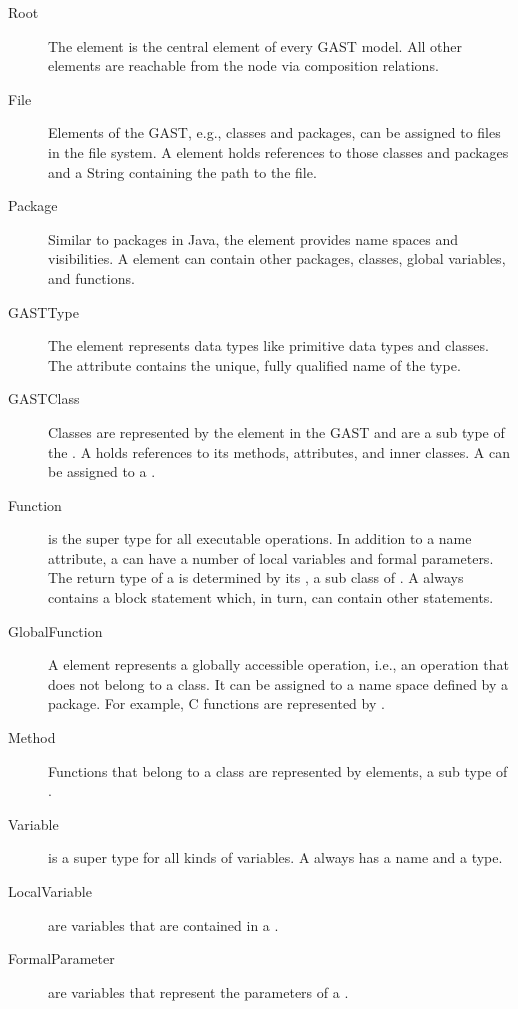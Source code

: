 \begin{description}
\item[Root] The  element is the central element of every GAST model. All other elements are reachable from the  node via composition relations.
\item[File] Elements of the GAST, e.g., classes and packages, can be assigned to files in the file system. A  element holds references to those classes and packages and a String containing the path to the file.
\item[Package] Similar to packages in Java, the  element provides name spaces and visibilities. A  element can contain other packages, classes, global variables, and functions.
\item[GASTType] The  element represents data types like primitive data types and classes. The attribute  contains the unique, fully qualified name of the type.
\item[GASTClass] Classes are represented by the element  in the GAST and are a sub type of the . A  holds references to its methods, attributes, and inner classes. A  can be assigned to a .
\item[Function]  is the super type for all executable operations. In addition to a name attribute, a  can have a number of local variables and formal parameters. The return type of a  is determined by its , a sub class of . A  always contains a block statement which, in turn, can contain other statements.
\item[GlobalFunction] A  element represents a globally accessible operation, i.e., an operation that does not belong to a class. It can be assigned to a name space defined by a package. For example, C functions are represented by .
\item[Method] Functions that belong to a class are represented by  elements, a sub type of .
\item[Variable]  is a super type for all kinds of variables. A  always has a name and a type.
\item[LocalVariable]  are variables that are contained in a .
\item[FormalParameter]  are variables that represent the parameters of a .

\end{description}
